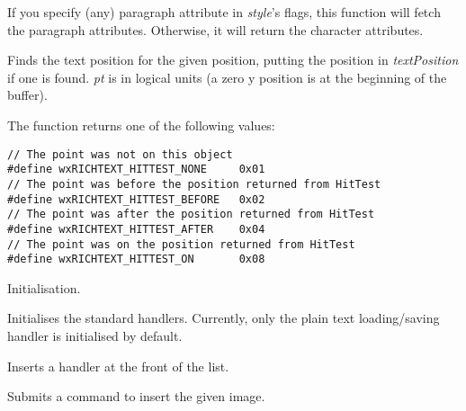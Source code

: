 If you specify (any) paragraph attribute in {\it style}'s flags, this function will fetch
the paragraph attributes. Otherwise, it will return the character attributes.

\label{wxrichtextbufferhittest}


Finds the text position for the given position, putting the position in {\it textPosition} if
one is found. {\it pt} is in logical units (a zero y position is
at the beginning of the buffer).

The function returns one of the following values:

{\small
\begin{verbatim}
// The point was not on this object
#define wxRICHTEXT_HITTEST_NONE     0x01
// The point was before the position returned from HitTest
#define wxRICHTEXT_HITTEST_BEFORE   0x02
// The point was after the position returned from HitTest
#define wxRICHTEXT_HITTEST_AFTER    0x04
// The point was on the position returned from HitTest
#define wxRICHTEXT_HITTEST_ON       0x08
\end{verbatim}
}

\label{wxrichtextbufferinit}


Initialisation.

\label{wxrichtextbufferinitstandardhandlers}


Initialises the standard handlers. Currently, only the plain text loading/saving handler
is initialised by default.

\label{wxrichtextbufferinserthandler}


Inserts a handler at the front of the list.

\label{wxrichtextbufferinsertimagewithundo}


Submits a command to insert the given image.

